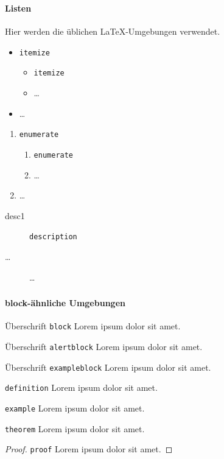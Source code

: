 \documentclass[usepdftitle=false, t]{beamer}
\begin{document}
\begin{frame}
  \frametitle{\insertsection}
  \framesubtitle{Listen}
  Hier werden die üblichen \LaTeX -Umgebungen verwendet.
  \begin{itemize}
  \item \texttt{itemize}
    \begin{itemize}
    \item \texttt{itemize}
    \item \ldots
    \end{itemize}
  \item \ldots
  \end{itemize}
  \vfill

  \begin{enumerate}
  \item \texttt{enumerate}
  \begin{enumerate}
  \item \texttt{enumerate}
  \item \ldots
  \end{enumerate}
  \item \ldots
  \end{enumerate}
  \vfill

  \begin{description}
  \item[desc1] \texttt{description}
  \item[\ldots] \ldots
  \end{description}
\end{frame}

\begin{frame}[allowframebreaks]
  \frametitle{\insertsection}
  \framesubtitle{block-ähnliche Umgebungen}
  \small

  \begin{block}{Überschrift}
  \texttt{block} Lorem ipsum dolor sit amet.
  \end{block}

  \begin{alertblock}{Überschrift}
  \texttt{alertblock} Lorem ipsum dolor sit amet.
  \end{alertblock}

  \begin{exampleblock}{Überschrift}
  \texttt{exampleblock} Lorem ipsum dolor sit amet.
  \end{exampleblock}

  \framebreak
  \begin{definition}
  \texttt{definition} Lorem ipsum dolor sit amet.
  \end{definition}

  \begin{example}
  \texttt{example} Lorem ipsum dolor sit amet.
  \end{example}

  \begin{theorem}
  \texttt{theorem} Lorem ipsum dolor sit amet.
  \end{theorem}

  \begin{proof}
  \texttt{proof} Lorem ipsum dolor sit amet.
  \end{proof}
\end{frame}
\end{document}
